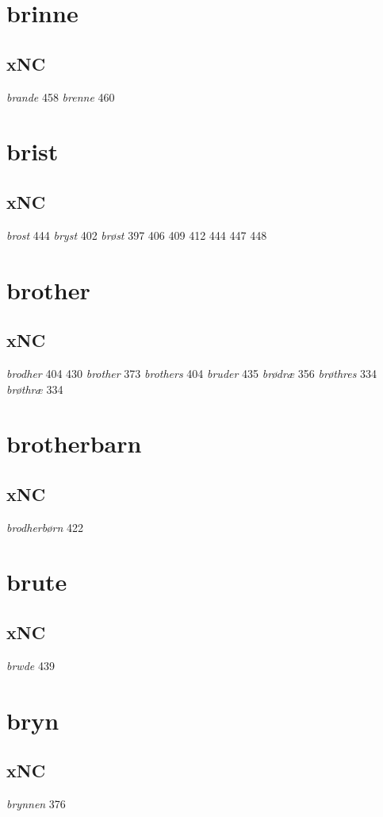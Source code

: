 \documentclass[a4paper,twocolumn]{article}
\begin{document}
\section{brinne}
\label{sec:org4ab8c2e}
\subsection{xNC}
\label{sec:orgef3d656}
\emph{brande} 458 \emph{brenne} 460 
\section{brist}
\label{sec:orga61dc6c}
\subsection{xNC}
\label{sec:org4ab5521}
\emph{brost} 444 \emph{bryst} 402 \emph{brøst} 397 406 409 412 444 447 448 
\section{brother}
\label{sec:org8ec3d0c}
\subsection{xNC}
\label{sec:org43d24fc}
\emph{brodher} 404 430 \emph{brother} 373 \emph{brothers} 404 \emph{bruder} 435 \emph{brødræ} 356 \emph{brøthres} 334 \emph{brøthræ} 334 
\section{brotherbarn}
\label{sec:org58159dc}
\subsection{xNC}
\label{sec:org1da3e0e}
\emph{brodherbørn} 422 
\section{brute}
\label{sec:org01f5cca}
\subsection{xNC}
\label{sec:orge61d199}
\emph{brwde} 439 
\section{bryn}
\label{sec:org6478223}
\subsection{xNC}
\label{sec:orgc1d8425}
\emph{brynnen} 376 
\end{document}
